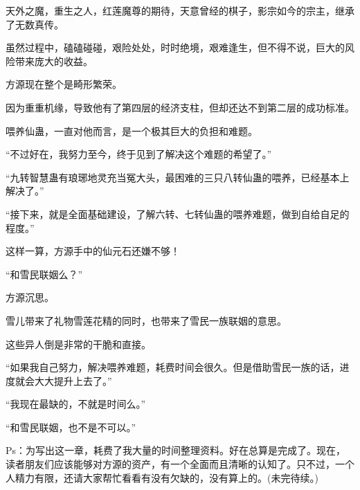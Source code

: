 \begin{this_body}
天外之魔，重生之人，红莲魔尊的期待，天意曾经的棋子，影宗如今的宗主，继承了无数真传。

虽然过程中，磕磕碰碰，艰险处处，时时绝境，艰难逢生，但不得不说，巨大的风险带来庞大的收益。

方源现在整个是畸形繁荣。

因为重重机缘，导致他有了第四层的经济支柱，但却还达不到第二层的成功标准。

喂养仙蛊，一直对他而言，是一个极其巨大的负担和难题。

“不过好在，我努力至今，终于见到了解决这个难题的希望了。”

“九转智慧蛊有琅琊地灵充当冤大头，最困难的三只八转仙蛊的喂养，已经基本上解决了。”

“接下来，就是全面基础建设，了解六转、七转仙蛊的喂养难题，做到自给自足的程度。”

这样一算，方源手中的仙元石还嫌不够！

“和雪民联姻么？”

方源沉思。

雪儿带来了礼物雪莲花精的同时，也带来了雪民一族联姻的意思。

这些异人倒是非常的干脆和直接。

“如果我自己努力，解决喂养难题，耗费时间会很久。但是借助雪民一族的话，进度就会大大提升上去了。”

“我现在最缺的，不就是时间么。”

“和雪民联姻，也不是不可以。”

Ps：为写出这一章，耗费了我大量的时间整理资料。好在总算是完成了。现在，读者朋友们应该能够对方源的资产，有一个全面而且清晰的认知了。只不过，一个人精力有限，还请大家帮忙看看有没有欠缺的，没有算上的。(未完待续。)

\end{this_body}

